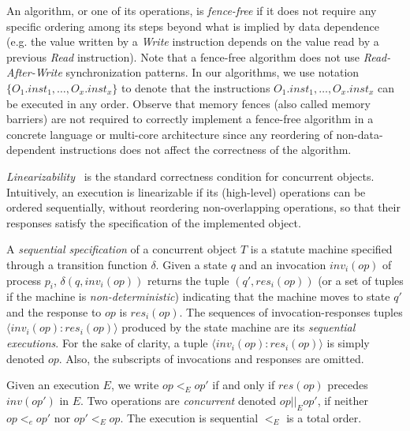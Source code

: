 An algorithm, or one of its operations, is \emph{fence-free} if it does not require any specific ordering among its steps beyond what is implied by data dependence (e.g. the value written by a \emph{Write} instruction depends on the value read by a previous \emph{Read} instruction). Note that a fence-free algorithm does not use \emph{Read-After-Write} synchronization patterns. In our algorithms, we use notation \(\{O_1.inst_1, \ldots, O_x.inst_x\}\) to denote that the instructions \(O_1.inst_1, \ldots, O_x.inst_x\) can be executed in any order. Observe that memory fences (also called memory barriers) are not required to correctly implement a fence-free algorithm in a concrete language or multi-core architecture since any reordering of non-data-dependent instructions does not affect the correctness of the algorithm.

\emph{Linearizability}~\cite{DBLP_journals_toplas_HerlihyW90} is the standard correctness condition for concurrent objects. Intuitively, an execution is linearizable if its (high-level) operations can be ordered sequentially, without reordering non-overlapping operations, so that their responses satisfy the specification of the implemented object.

A \emph{sequential specification} of a concurrent object \(T\) is a statute machine specified through a transition function \(\delta\). Given a state \(q\) and an invocation \(inv_i(op)\) of process \(p_i\), \(\delta(q, inv_i(op))\) returns the tuple \((q', res_i(op))\) (or a set of tuples if the machine is \emph{non-deterministic}) indicating that the machine moves to state \(q'\) and the response to \(op\) is \(res_i(op)\). The sequences of invocation-responses tuples \(\langle inv_i(op): res_i(op)\rangle\) produced by the state machine are its \emph{sequential executions}. For the sake of clarity, a tuple \(\langle inv_i(op): res_i(op)\rangle\) is simply denoted \(op\). Also, the subscripts of invocations and responses are omitted.

Given an execution \(E\), we write \(op <_E op'\) if and only if \(res(op)\) precedes \(inv(op')\) in \(E\). Two operations are \emph{concurrent} denoted \(op||_E op' \), if neither \(op <_e op'\) nor \(op' <_E op\). The execution is sequential \(<_E\) is a total order.

